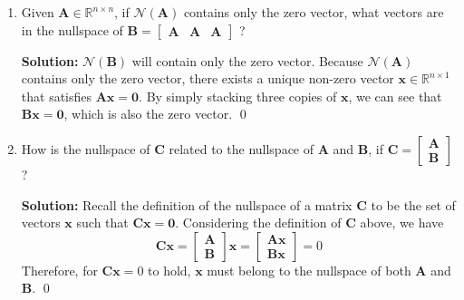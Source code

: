 \begin{enumerate}[label=(\alph*)]
	\item Given $\mathbf{A} \in \mathbb{R}^{n \times n}$, if
	      $\mathcal{N}(\mathbf{A})$ contains only the zero vector, what vectors
	      are in the nullspace of $\mathbf{B}=\left[\begin{array}{lll}
				      \mathbf{A} & \mathbf{A} & \mathbf{A}
			      \end{array}\right]$ ?

	      \par \textbf{Solution:} $\mathcal{N}(\mathbf{B})$ will contain only
	      the zero vector. Because $\mathcal{N}(\mathbf{A})$ contains
	      only the zero vector, there exists a unique non-zero vector
	      $\mathbf{x} \in \mathbb{R}^{n \times 1}$ that satisfies
	      $\mathbf{A}\mathbf{x} = \mathbf{0}$. By simply stacking three copies
	      of $\mathbf{x}$, we can see that $\mathbf{B}\mathbf{x} = \mathbf{0}$,
	      which is also the zero vector.
	      \qed

	\item How is the nullspace of $\mathbf{C}$ related to the nullspace of
	      $\mathbf{A}$ and $\mathbf{B}$, if $\mathbf{C}=\left[\begin{array}{l}
				      \mathbf{A} \\
				      \mathbf{B}
			      \end{array}\right]$?

	      \par \textbf{Solution:} Recall the definition of the nullspace of a
	      matrix $\mathbf{C}$ to be the set of vectors $\mathbf{x}$ such that
	      $\mathbf{Cx} = \mathbf{0}$. Considering the definition of $\mathbf{C}$
	      above, we have
	      $$
		      \mathbf{Cx} =
		      \left[\begin{array}{l}
				      \mathbf{A} \\
				      \mathbf{B}
			      \end{array}\right]
		      \mathbf{x} =
		      \left[\begin{array}{l}
				      \mathbf{Ax} \\
				      \mathbf{Bx}
			      \end{array}\right] = 0
	      $$
	      Therefore, for $\mathbf{Cx} = 0$ to hold, $\mathbf{x}$ must belong to
	      the nullspace of both $\mathbf{A}$ and $\mathbf{B}$.
	      \qed

\end{enumerate}
